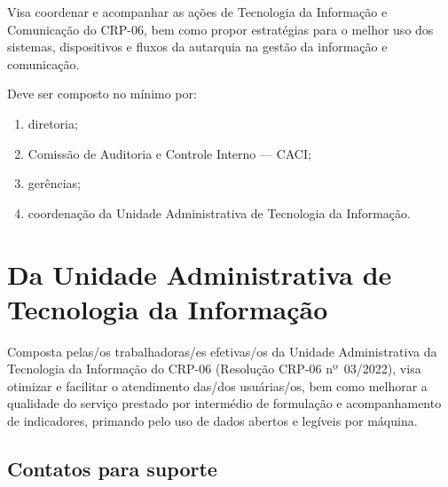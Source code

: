 \documentclass[openright, twoside, a4paper]{memoir}
\begin{document}
Visa coordenar e acompanhar as ações de Tecnologia da Informação e
Comunicação do CRP-06, bem como propor estratégias para o melhor uso dos
sistemas, dispositivos e fluxos da autarquia na gestão da informação e
comunicação.

Deve ser composto no mínimo por:

\begin{enumerate}

\item
    diretoria;
\item
    Comissão de Auditoria e Controle Interno --- CACI;
\item
    gerências;
\item
    coordenação da Unidade Administrativa de Tecnologia da Informação.
\end{enumerate}

\section{Da Unidade Administrativa de Tecnologia da
Informação}

Composta pelas/os trabalhadoras/es efetivas/os da Unidade Administrativa
da Tecnologia da Informação do CRP-06 (Resolução CRP-06 nº~03/2022),
visa otimizar e facilitar o atendimento das/dos usuárias/os, bem como
melhorar a qualidade do serviço prestado por intermédio de formulação e
acompanhamento de indicadores, primando pelo uso de dados abertos e
legíveis por máquina.

\subsection{Contatos para suporte}
\end{document}

